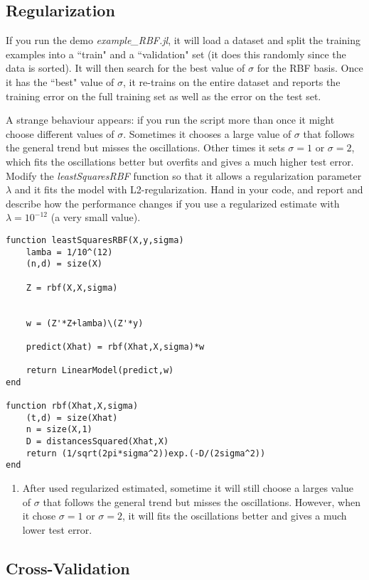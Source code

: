 \documentclass{article}
\def\blu#1{{\color{blu}#1}}
\def\enum#1{\begin{enumerate}#1\end{enumerate}}
\begin{document}
\subsection{Regularization}

If you run the demo \emph{example\_RBF.jl}, it will load a dataset and split the training examples into a ``train" and a ``validation" set (it does this randomly since the data is sorted). It will then search for the best value of $\sigma$ for the RBF basis. Once it has the ``best" value of $\sigma$, it re-trains on the entire dataset and reports the training error on the full training set as well as the error on the test set.

A strange behaviour appears: if you run the script more than once it might choose different values of $\sigma$. Sometimes it chooses a large value of $\sigma$ that follows the general trend but misses the oscillations. Other times it sets $\sigma = 1$ or $\sigma=2$, which fits the oscillations better but overfits and gives a much higher test error. \blu{Modify the \emph{leastSquaresRBF} function so that it allows a regularization parameter $\lambda$ and it fits the model with L2-regularization. Hand in your code, and report and describe how the performance changes if you use a regularized estimate with $\lambda = 10^{-12}$ (a very small value).}

\begin{verbatim}
function leastSquaresRBF(X,y,sigma)
	lamba = 1/10^(12)
	(n,d) = size(X)

	Z = rbf(X,X,sigma)


 	w = (Z'*Z+lamba)\(Z'*y)
 
	predict(Xhat) = rbf(Xhat,X,sigma)*w

	return LinearModel(predict,w)
end

function rbf(Xhat,X,sigma)
	(t,d) = size(Xhat)
	n = size(X,1)
	D = distancesSquared(Xhat,X)
	return (1/sqrt(2pi*sigma^2))exp.(-D/(2sigma^2))
end
\end{verbatim}

\enum{
\item After used regularized estimated, sometime it will still choose a larges value of  $\sigma$  that follows the general trend but misses the oscillations. However, when it chose $\sigma = 1$ or $\sigma=2$, it will fits the oscillations better and gives a much lower test error.
}

\subsection{Cross-Validation}
\end{document}
